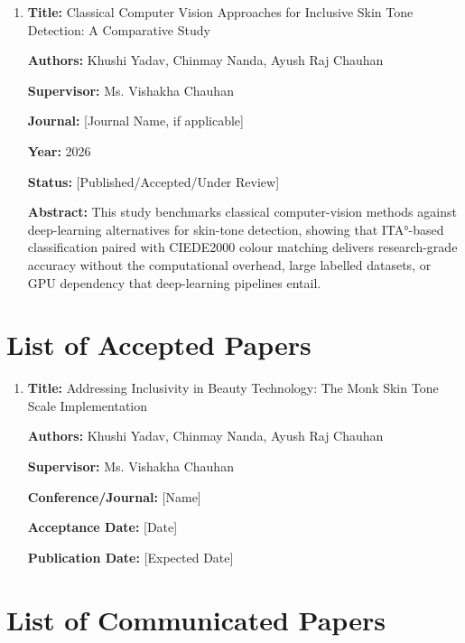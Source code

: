 \begin{enumerate}
    \item \textbf{Title:} Classical Computer Vision Approaches for Inclusive Skin Tone Detection: A Comparative Study
    
    \textbf{Authors:} Khushi Yadav, Chinmay Nanda, Ayush Raj Chauhan
    
    \textbf{Supervisor:} Ms. Vishakha Chauhan
    
    \textbf{Journal:} [Journal Name, if applicable]
    
    \textbf{Year:} 2026
    
    \textbf{Status:} [Published/Accepted/Under Review]
    
    \textbf{Abstract:} This study benchmarks classical computer-vision methods against deep-learning alternatives for skin-tone detection, showing that ITA°-based classification paired with CIEDE2000 colour matching delivers research-grade accuracy without the computational overhead, large labelled datasets, or GPU dependency that deep-learning pipelines entail.
\end{enumerate}

\section{List of Accepted Papers}

\begin{enumerate}
    \item \textbf{Title:} Addressing Inclusivity in Beauty Technology: The Monk Skin Tone Scale Implementation
    
    \textbf{Authors:} Khushi Yadav, Chinmay Nanda, Ayush Raj Chauhan
    
    \textbf{Supervisor:} Ms. Vishakha Chauhan
    
    \textbf{Conference/Journal:} [Name]
    
    \textbf{Acceptance Date:} [Date]
    
    \textbf{Publication Date:} [Expected Date]
\end{enumerate}

\section{List of Communicated Papers}

